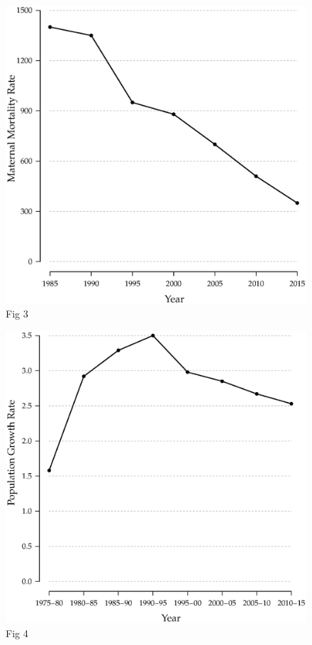 \documentclass[a4paper, twocolumn]{article}
\begin{document}
\lipsum[2]

\begin{figure}[!hbtp]
\includegraphics[width = \columnwidth]{../figures/fig3.eps}
\caption{Fig 3}
\end{figure}

\lipsum[3]

\begin{figure}[!hbtp]
\includegraphics[width = \columnwidth]{../figures/fig4.eps}
\caption{Fig 4}
\end{figure}
\end{document}
